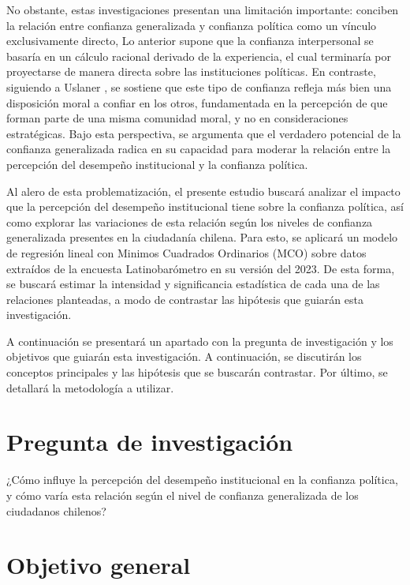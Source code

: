\documentclass[12pt,twoside]{templates/facsothesis}
\begin{document}
No obstante, estas investigaciones presentan una limitación importante: conciben la relación entre confianza generalizada y confianza política como un vínculo exclusivamente directo, Lo anterior supone que la confianza interpersonal se basaría en un cálculo racional derivado de la experiencia, el cual terminaría por proyectarse de manera directa sobre las instituciones políticas. En contraste, siguiendo a Uslaner \citeyearpar[-@uslanerStudyTrust2017]{uslanerMoralFoundationsTrust2002}, se sostiene que este tipo de confianza refleja más bien una disposición moral a confiar en los otros, fundamentada en la percepción de que forman parte de una misma comunidad moral, y no en consideraciones estratégicas. Bajo esta perspectiva, se argumenta que el verdadero potencial de la confianza generalizada radica en su capacidad para moderar la relación entre la percepción del desempeño institucional y la confianza política.

Al alero de esta problematización, el presente estudio buscará analizar el impacto que la percepción del desempeño institucional tiene sobre la confianza política, así como explorar las variaciones de esta relación según los niveles de confianza generalizada presentes en la ciudadanía chilena. Para esto, se aplicará un modelo de regresión lineal con Minimos Cuadrados Ordinarios (MCO) sobre datos extraídos de la encuesta Latinobarómetro en su versión del 2023. De esta forma, se buscará estimar la intensidad y significancia estadística de cada una de las relaciones planteadas, a modo de contrastar las hipótesis que guiarán esta investigación.

A continuación se presentará un apartado con la pregunta de investigación y los objetivos que guiarán esta investigación. A continuación, se discutirán los conceptos principales y las hipótesis que se buscarán contrastar. Por último, se detallará la metodología a utilizar.

\section{Pregunta de investigación}\label{pregunta-de-investigaciuxf3n}

¿Cómo influye la percepción del desempeño institucional en la confianza política, y cómo varía esta relación según el nivel de confianza generalizada de los ciudadanos chilenos?

\section{Objetivo general}\label{objetivo-general}
\end{document}
